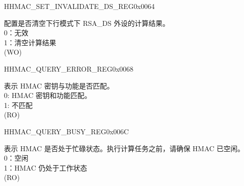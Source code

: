 \begin{register}{H}{HMAC\_SET\_INVALIDATE\_DS\_REG}{0x0064}\label{regdesc:HMACSETINVALIDATEDSREG}
%
%
\regnewline%
\begin{regdesc}\begin{reglist}
\label{fielddesc:HMACSETINVALIDATEDS}\item [HMAC\_SET\_INVALIDATE\_DS] 配置是否清空下行模式下 RSA\_DS 外设的计算结果。
\\0：无效
\\1：清空计算结果
\\(WO)
\end{reglist}\end{regdesc}
\end{register}


\begin{register}{H}{HMAC\_QUERY\_ERROR\_REG}{0x0068}\label{regdesc:HMACQUERYERRORREG}
%
%
\regnewline%
\begin{regdesc}\begin{reglist}
\label{fielddesc:HMACQUREYCHECK}\item [HMAC\_QUREY\_CHECK] 表示 HMAC 密钥与功能是否匹配。
\\0: HMAC 密钥和功能匹配。
\\1: 不匹配
\\(RO)
\end{reglist}\end{regdesc}
\end{register}


\begin{register}{H}{HMAC\_QUERY\_BUSY\_REG}{0x006C}\label{regdesc:HMACQUERYBUSYREG}
%
%
\regnewline%
\begin{regdesc}\begin{reglist}
\label{fielddesc:HMACBUSYSTATE}\item [HMAC\_BUSY\_STATE] 表示 HMAC 是否处于忙碌状态。执行计算任务之前，请确保 HMAC 已空闲。
\\0：空闲
\\1：HMAC 仍处于工作状态
\\(RO)
\end{reglist}\end{regdesc}
\end{register}


